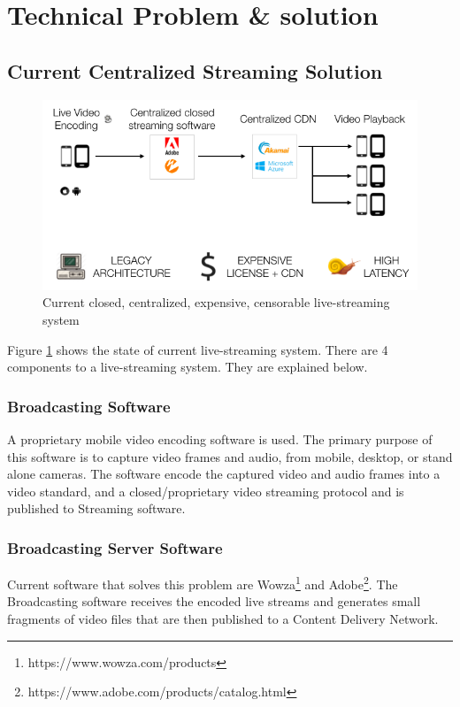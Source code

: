 \documentclass{article}
\begin{document}
\section{Technical Problem \& solution}


\subsection{Current Centralized Streaming Solution}

\begin{figure}[h!]
 \centering
 \includegraphics[width=1.0\textwidth]{static/problem-architecture}
 \caption{Current closed, centralized, expensive, censorable live-streaming system}
 \label{image:problem-architecture}
\end{figure}

Figure \ref{image:problem-architecture} shows the state of current live-streaming system. There are 4 components to a live-streaming system. They are explained below.
\subsubsection{Broadcasting Software}
A proprietary mobile video encoding software is used. The primary purpose of this software is to capture video frames and audio, from mobile, desktop, or stand alone cameras. The software encode the captured video and audio frames into a video standard, and a closed/proprietary video streaming protocol and is published to Streaming software.

\subsubsection{Broadcasting Server Software}
Current software that solves this problem are Wowza\footnote{https://www.wowza.com/products} and Adobe\footnote{https://www.adobe.com/products/catalog.html}. The Broadcasting software receives the encoded live streams and generates small fragments of video files that are then published to a Content Delivery Network.
\end{document}
